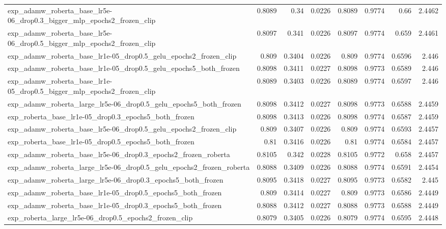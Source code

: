 \documentclass[a4paper,oneside,bibliography=totoc]{scrbook}
\begin{document}
\begin{landscape}
\begin{center}
\begin{longtable}{p{4cm} *{7}{r}}
        exp\_adamw\_roberta\_base\_lr5e-06\_drop0.3\_bigger\_mlp\_epochs2\_frozen\_clip & 0.8089 & 0.34 & 0.0226 & 0.8089 & 0.9774 & 0.66 & 2.4462 \\ 
        exp\_adamw\_roberta\_base\_lr5e-06\_drop0.5\_bigger\_mlp\_epochs2\_frozen\_clip & 0.8097 & 0.341 & 0.0226 & 0.8097 & 0.9774 & 0.659 & 2.4461 \\ 
        exp\_adamw\_roberta\_base\_lr1e-05\_drop0.5\_gelu\_epochs2\_frozen\_clip & 0.809 & 0.3404 & 0.0226 & 0.809 & 0.9774 & 0.6596 & 2.446 \\ 
        exp\_adamw\_roberta\_base\_lr1e-05\_drop0.5\_gelu\_epochs5\_both\_frozen & 0.8098 & 0.3411 & 0.0227 & 0.8098 & 0.9773 & 0.6589 & 2.446 \\ 
        exp\_adamw\_roberta\_base\_lr1e-05\_drop0.5\_bigger\_mlp\_epochs2\_frozen\_clip & 0.8089 & 0.3403 & 0.0226 & 0.8089 & 0.9774 & 0.6597 & 2.446 \\ 
        exp\_adamw\_roberta\_large\_lr5e-06\_drop0.5\_gelu\_epochs5\_both\_frozen & 0.8098 & 0.3412 & 0.0227 & 0.8098 & 0.9773 & 0.6588 & 2.4459 \\ 
        exp\_roberta\_base\_lr1e-05\_drop0.3\_epochs5\_both\_frozen & 0.8098 & 0.3413 & 0.0226 & 0.8098 & 0.9774 & 0.6587 & 2.4459 \\ 
        exp\_adamw\_roberta\_base\_lr5e-06\_drop0.5\_gelu\_epochs2\_frozen\_clip & 0.809 & 0.3407 & 0.0226 & 0.809 & 0.9774 & 0.6593 & 2.4457 \\ 
        exp\_roberta\_base\_lr1e-05\_drop0.5\_epochs5\_both\_frozen & 0.81 & 0.3416 & 0.0226 & 0.81 & 0.9774 & 0.6584 & 2.4457 \\ 
        exp\_adamw\_roberta\_base\_lr5e-06\_drop0.3\_epochs2\_frozen\_roberta & 0.8105 & 0.342 & 0.0228 & 0.8105 & 0.9772 & 0.658 & 2.4457 \\ 
        exp\_adamw\_roberta\_large\_lr5e-06\_drop0.5\_gelu\_epochs2\_frozen\_roberta & 0.8088 & 0.3409 & 0.0226 & 0.8088 & 0.9774 & 0.6591 & 2.4454 \\ 
        exp\_adamw\_roberta\_large\_lr5e-06\_drop0.3\_epochs5\_both\_frozen & 0.8095 & 0.3418 & 0.0227 & 0.8095 & 0.9773 & 0.6582 & 2.445 \\ 
        exp\_adamw\_roberta\_base\_lr1e-05\_drop0.5\_epochs5\_both\_frozen & 0.809 & 0.3414 & 0.0227 & 0.809 & 0.9773 & 0.6586 & 2.4449 \\ 
        exp\_adamw\_roberta\_base\_lr1e-05\_drop0.3\_epochs5\_both\_frozen & 0.8088 & 0.3412 & 0.0227 & 0.8088 & 0.9773 & 0.6588 & 2.4449 \\ 
        exp\_roberta\_large\_lr5e-06\_drop0.5\_epochs2\_frozen\_clip & 0.8079 & 0.3405 & 0.0226 & 0.8079 & 0.9774 & 0.6595 & 2.4448 \\ 

\end{longtable}
\end{center}
\end{landscape}
\end{document}
